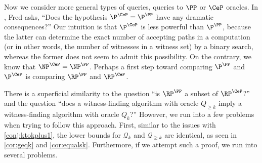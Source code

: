 \documentclass{article}
\newcommand{\mc}{\mathcal}
\begin{document}
Now we consider more general types of queries, queries to $\PP$ or $\CeP$ oracles.
In \autocite[Section~7]{green93}, Fred asks, ``Does the hypothesis $\P^{\CeP} = \P^\PP$ have any dramatic consequences?''
Our intuition is that $\P^{\CeP}$ is less powerful than $\P^\PP$, because the latter can determine the exact number of accepting paths in a computation (or in other words, the number of witnesses in a witness set) by a binary search, whereas the former does not seem to admit this possibility.
On the contrary, we know that $\NP^{\CeP} = \NP^\PP$.
Perhaps a first step toward comparing $\P^\PP$ and $\P^{\CeP}$ is comparing $\RP^\PP$ and $\RP^{\CeP}$.

There is a superficial similarity to the question ``is $\RP^\PP$ a subset of $\RP^{\CeP}$?'' and the question ``does a witness-finding algorithm with oracle $Q_{\geq k}$ imply a witness-finding algorithm with oracle $Q_k$?''
However, we run into a few problems when trying to follow this approach.
First, similar to the issues with \autoref{conj:ktokplus1}, the lower bounds for $\mc{Q}_k$ and $\mc{Q}_{\geq k}$ are identical, as seen in \autoref{cor:geqk} and \autoref{cor:equalsk}.
Furthermore, if we attempt such a proof, we run into several problems.
\end{document}
